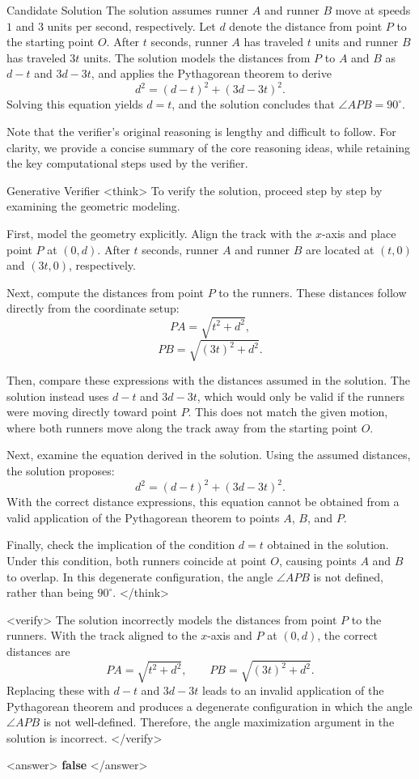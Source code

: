 \documentclass[11pt]{article}
\begin{document}
\begin{exbox}{Candidate Solution}
The solution assumes runner $A$ and runner $B$ move at speeds $1$ and $3$ units per second,
respectively.
Let $d$ denote the distance from point $P$ to the starting point $O$.
After $t$ seconds, runner $A$ has traveled $t$ units and runner $B$ has traveled $3t$ units.
The solution models the distances from $P$ to $A$ and $B$ as $d - t$ and $3d - 3t$,
and applies the Pythagorean theorem to derive
\[
d^2 = (d - t)^2 + (3d - 3t)^2.
\]
Solving this equation yields $d = t$, and the solution concludes that
$\angle APB = 90^\circ$.
\end{exbox}

Note that the verifier's original reasoning is lengthy and difficult to follow.
For clarity, we provide a concise summary of the core reasoning ideas,
while retaining the key computational steps used by the verifier.

\begin{exbox}{Generative Verifier}
<think>
To verify the solution, proceed step by step by examining the geometric modeling.

First, model the geometry explicitly.
Align the track with the $x$-axis and place point $P$ at $(0,d)$.
After $t$ seconds, runner $A$ and runner $B$ are located at $(t,0)$ and $(3t,0)$,
respectively.

Next, compute the distances from point $P$ to the runners.
These distances follow directly from the coordinate setup:
\[
PA = \sqrt{t^2 + d^2},
\]
\[
PB = \sqrt{(3t)^2 + d^2}.
\]

Then, compare these expressions with the distances assumed in the solution.
The solution instead uses $d - t$ and $3d - 3t$, which would only be valid if the
runners were moving directly toward point $P$.
This does not match the given motion, where both runners move along the track
away from the starting point $O$.

Next, examine the equation derived in the solution.
Using the assumed distances, the solution proposes:
\[
d^2 = (d - t)^2 + (3d - 3t)^2.
\]
With the correct distance expressions, this equation cannot be obtained from a
valid application of the Pythagorean theorem to points $A$, $B$, and $P$.

Finally, check the implication of the condition $d = t$ obtained in the solution.
Under this condition, both runners coincide at point $O$, causing points $A$ and
$B$ to overlap.
In this degenerate configuration, the angle $\angle APB$ is not defined, rather
than being $90^\circ$.
</think>

<verify>
The solution incorrectly models the distances from point $P$ to the runners.
With the track aligned to the $x$-axis and $P$ at $(0,d)$, the correct distances are
\[
PA = \sqrt{t^2 + d^2}, \qquad PB = \sqrt{(3t)^2 + d^2}.
\]
Replacing these with $d - t$ and $3d - 3t$ leads to an invalid application of the
Pythagorean theorem and produces a degenerate configuration in which the angle
$\angle APB$ is not well-defined.
Therefore, the angle maximization argument in the solution is incorrect.
</verify>

<answer>
\textbf{false}
</answer>
\end{exbox}
\end{document}

